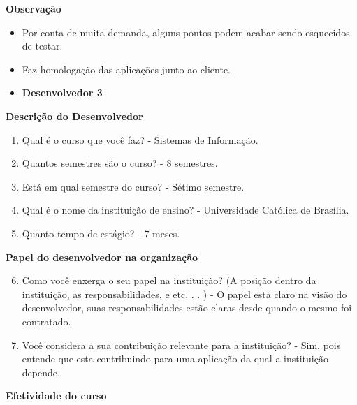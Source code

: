 \begin{apendicesenv}
\textbf{Observação}

\begin{itemize}
	\item Por conta de muita demanda, alguns pontos podem acabar sendo esquecidos de testar.
	\item Faz homologação das aplicações junto ao cliente.
\end{itemize}


\begin{itemize}
	\item \textbf{Desenvolvedor 3}
\end{itemize}

\textbf{Descrição do Desenvolvedor}

\begin{enumerate}
	\item Qual é o curso que você faz?\newline
	- Sistemas de Informação.
	\item Quantos semestres são o curso?\newline
	- 8 semestres.
	\item Está em qual semestre do curso?\newline
	- Sétimo semestre.
	\item Qual é o nome da instituição de ensino?\newline
	- Universidade Católica de Brasília.
	\item Quanto tempo de estágio?\newline
	- 7 meses.
\end{enumerate}

\textbf{Papel do desenvolvedor na organização}

\begin{enumerate}
	\setcounter{enumi}{5}
	\item Como você enxerga o seu papel na instituição? (A posição dentro da instituição, as
	responsabilidades, e etc. . . )\newline
	- O papel esta claro na visão do desenvolvedor, suas responsabilidades estão claras desde quando o mesmo foi contratado.
	\item Você considera a sua contribuição relevante para a instituição?\newline
	- Sim, pois entende que esta contribuindo para uma aplicação da qual a instituição depende.
\end{enumerate}

\textbf{Efetividade do curso}


\end{apendicesenv}
